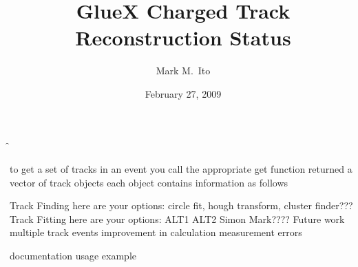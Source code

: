 \documentclass[xcolor=dvipsnames]{beamer}
\begin{document}
\title{GlueX Charged Track Reconstruction Status}
\author[M.\ Ito]{Mark M.\ Ito}
\date{February 27, 2009}

\f{\titlepage}

\f{
    \be
    \I to get a set of tracks in an event you call the appropriate get function
    \I returned a vector of track objects
    \I each object contains information as follows
    \ee
}

\f{
  \be
  \I Track Finding
    \be
    \I here are your options: circle fit, hough transform, cluster finder???
    \ee
  \I Track Fitting
    \be
    \I here are your options: ALT1 ALT2 Simon Mark????
    \ee
  \I Future work
    \be
    \I multiple track events
    \I improvement in calculation measurement errors
    \ee
  \ee
}

\f{
  \be
  \I documentation
  \I usage example
  \ee
}
\end{document}
